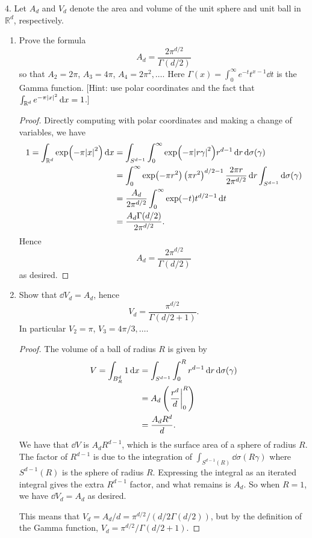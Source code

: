 \documentclass[11pt]{article}
\newcommand{\br}[1]{\left(#1\right)}
\begin{document}
4. Let $A_d$ and $V_d$ denote the area and volume of the unit sphere and unit ball in $\mathbb{R}^d$, respectively. \begin{enumerate}[label=(\alph*)]
  \item Prove the formula \[A_d = \frac{2\pi^{d/2}}{\Gamma(d/2)}\] so that $A_2 = 2\pi$, $A_3 = 4\pi$, $A_4 = 2\pi^2, \dots$. Here $\Gamma(x) = \int_0^\infty e^{-t}t^{x-1}\dd{t}$ is the Gamma function. [Hint: use polar coordinates and the fact that $\int_{\mathbb{R}^d} e^{-\pi\abs{x}^2}\dd{x} = 1$.]
  \begin{proof}
    Directly computing with polar coordinates and making a change of variables, we have \begin{align*}
      1 = \int_{\mathbb{R}^d} \exp(-\pi \abs{x}^2)\dd{x} &= \int_{S^{d-1}}\int_0^{\infty} \exp(-\pi \abs{r\gamma}^2)r^{d-1}\dd{r}\dd{\sigma(\gamma)}\\
      &= \int_0^{\infty} \exp(-\pi r^2)\br{\pi r^2}^{d/2-1}\frac{2\pi r}{2\pi^{d/2}}\dd{r}\int_{S^{d-1}}\dd{\sigma(\gamma)}\\
      &= \frac{A_d}{2\pi^{d/2}}\int_0^{\infty} \exp(-t)t^{d/2-1}\dd{t}\\
      &= \frac{A_d\Gamma(d/2)}{2\pi^{d/2}}.
    \end{align*} Hence \[A_d = \frac{2\pi^{d/2}}{\Gamma(d/2)}\] as desired.
  \end{proof}
  \item Show that $\dd{V_d} = A_d$, hence \[V_d =\frac{\pi^{d/2}}{\Gamma(d/2+1)}.\] In particular $V_2 = \pi$, $V_3 = 4\pi/3, \dots$.
  \begin{proof}
    The volume of a ball of radius $R$ is given by \begin{align*}
      V = \int_{B^d_R} 1\dd{x} &= \int_{S^{d-1}}\int_0^R r^{d-1}\dd{r}\dd{\sigma(\gamma)}\\
      &= A_d\br{\eval{\frac{r^d}{d}}_0^R}\\
      &= \frac{A_dR^d}{d}.
    \end{align*} We have that $\dd{V}$ is $A_dR^{d-1}$, which is the surface area of a sphere of radius $R$. The factor of $R^{d-1}$ is due to the integration of $\int_{S^{d-1}(R)}\dd{\sigma(R\gamma)}$ where $S^{d-1}(R)$ is the sphere of radius $R$. Expressing the integral as an iterated integral gives the extra $R^{d-1}$ factor, and what remains is $A_d$. So when $R=1$, we have $\dd{V_d} = A_d$ as desired.

    This means that $V_d = A_d/d = \pi^{d/2}/(d/2\Gamma(d/2))$, but by the definition of the Gamma function, $V_d = \pi^{d/2}/\Gamma(d/2+1)$.
  \end{proof}
\end{enumerate}
\end{document}
